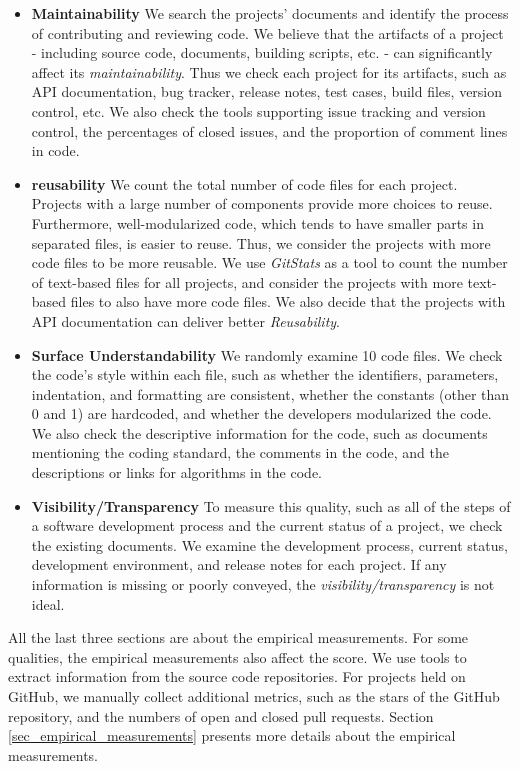 \begin{itemize}
\item \textbf{Maintainability} We search the projects' documents and identify the process of contributing and reviewing code. We believe that the artifacts of a project - including source code, documents, building scripts, etc. - can significantly affect its  \textit{maintainability}. Thus we check each project for its artifacts, such as API documentation, bug tracker, release notes, test cases, build files, version control, etc. We also check the tools supporting issue tracking and version control, the percentages of closed issues, and the proportion of comment lines in code.

\item \textbf{reusability} We count the total number of code files for each project. Projects with a large number of components provide more choices to reuse. Furthermore, well-modularized code, which tends to have smaller parts in separated files, is easier to reuse. Thus, we consider the projects with more code files to be more reusable. We use \textit{GitStats} as a tool to count the number of text-based files for all projects, and consider the projects with more text-based files to also have more code files. We also decide that the projects with API documentation can deliver better \textit{Reusability}.

\item \textbf{Surface Understandability} We randomly examine 10 code files. We check the code’s style within each file, such as whether the identifiers, parameters, indentation, and formatting are consistent, whether the constants (other than 0 and 1) are hardcoded, and whether the developers modularized the code. We also check the descriptive information for the code, such as documents mentioning the coding standard, the comments in the code, and the descriptions or links for algorithms in the code. 

\item \textbf{Visibility/Transparency} To measure this quality, such as all of the steps of a software development process and the current status of a project, we check the existing documents. We examine the development process, current status, development environment, and release notes for each project. If any information is missing or poorly conveyed, the \textit{visibility/transparency} is not ideal.
\end{itemize}

All the last three sections are about the empirical measurements. For some qualities, the empirical measurements also affect the score. We use tools to extract information from the source code repositories. For projects held on GitHub, we manually collect additional metrics, such as the stars of the GitHub repository, and the numbers of open and closed pull requests. Section \ref{sec_empirical_measurements} presents more details about the empirical measurements.

